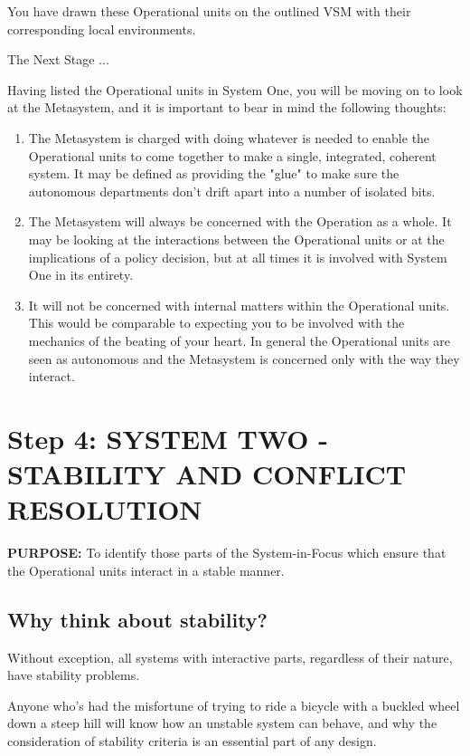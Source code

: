 You have drawn these Operational units on the outlined VSM with their corresponding local environments.

The Next Stage ...

Having listed the Operational units in System One, you will be moving on to look at the Metasystem, and it is important to bear in mind the following thoughts:

\begin{enumerate}
  \item The Metasystem is charged with doing whatever is needed to enable the Operational units to come together to make a single, integrated, coherent system. It may be defined as providing the "glue" to make sure the autonomous departments don't drift apart into a number of isolated bits.

  \item The Metasystem will always be concerned with the Operation as a whole. It may be looking at the interactions between the Operational units or at the implications of a policy decision, but at all times it is involved with System One in its entirety.

  \item It will not be concerned with internal matters within the Operational units. This would be comparable to expecting you to be involved with the mechanics of the beating of your heart. In general the Operational units are seen as autonomous and the Metasystem is concerned only with the way they interact.

\end{enumerate}

\section*{Step 4: SYSTEM TWO - STABILITY AND CONFLICT RESOLUTION}
\textbf{PURPOSE:} To identify those parts of the System-in-Focus which ensure that the Operational units interact in a stable manner.

\subsection*{Why think about stability?}
Without exception, all systems with interactive parts, regardless of their nature, have stability problems.

Anyone who's had the misfortune of trying to ride a bicycle with a buckled wheel down a steep hill will know how an unstable system can behave, and why the consideration of stability criteria is an essential part of any design.


